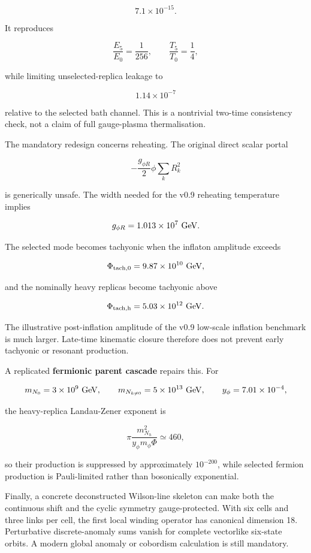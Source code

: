 \documentclass[
  10pt,
]{article}
\begin{document}
\[
7.1\times10^{-15}.
\]

It reproduces

\[
\frac{E_5}{E_0}=\frac1{256},
\qquad
\frac{T_5}{T_0}=\frac14,
\]

while limiting unselected-replica leakage to

\[
1.14\times10^{-7}
\]

relative to the selected bath channel. This is a nontrivial two-time
consistency check, not a claim of full gauge-plasma thermalisation.

The mandatory redesign concerns reheating. The original direct scalar
portal

\[
-\frac{g_{\phi R}}2\phi\sum_kR_k^2
\]

is generically unsafe. The width needed for the v0.9 reheating
temperature implies

\[
g_{\phi R}=1.013\times10^7\ {\rm GeV}.
\]

The selected mode becomes tachyonic when the inflaton amplitude exceeds

\[
\Phi_{\rm tach,0}=9.87\times10^{10}\ {\rm GeV},
\]

and the nominally heavy replicas become tachyonic above

\[
\Phi_{\rm tach,h}=5.03\times10^{12}\ {\rm GeV}.
\]

The illustrative post-inflation amplitude of the v0.9 low-scale
inflation benchmark is much larger. Late-time kinematic closure
therefore does not prevent early tachyonic or resonant production.

A replicated \textbf{fermionic parent cascade} repairs this. For

\[
m_{N_0}=3\times10^9\ {\rm GeV},
\qquad
m_{N_{k\ne0}}=5\times10^{13}\ {\rm GeV},
\qquad
y_\phi=7.01\times10^{-4},
\]

the heavy-replica Landau-Zener exponent is

\[
\pi\frac{m_{N_h}^2}{y_\phi m_\phi\Phi}\simeq460,
\]

so their production is suppressed by approximately \(10^{-200}\), while
selected fermion production is Pauli-limited rather than bosonically
exponential.

Finally, a concrete deconstructed Wilson-line skeleton can make both the
continuous shift and the cyclic symmetry gauge-protected. With six cells
and three links per cell, the first local winding operator has canonical
dimension 18. Perturbative discrete-anomaly sums vanish for complete
vectorlike six-state orbits. A modern global anomaly or cobordism
calculation is still mandatory.
\end{document}
